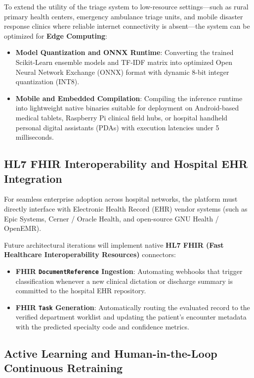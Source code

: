 To extend the utility of the triage system to low-resource settings---such as rural primary health centers, emergency ambulance triage units, and mobile disaster response clinics where reliable internet connectivity is absent---the system can be optimized for \textbf{Edge Computing}:
\begin{itemize}
    \item \textbf{Model Quantization and ONNX Runtime}: Converting the trained Scikit-Learn ensemble models and TF-IDF matrix into optimized Open Neural Network Exchange (ONNX) format with dynamic 8-bit integer quantization (INT8).
    \item \textbf{Mobile and Embedded Compilation}: Compiling the inference runtime into lightweight native binaries suitable for deployment on Android-based medical tablets, Raspberry Pi clinical field hubs, or hospital handheld personal digital assistants (PDAs) with execution latencies under 5 milliseconds.
\end{itemize}

\subsection{HL7 FHIR Interoperability and Hospital EHR Integration}

For seamless enterprise adoption across hospital networks, the platform must directly interface with Electronic Health Record (EHR) vendor systems (such as Epic Systems, Cerner / Oracle Health, and open-source GNU Health / OpenEMR).

Future architectural iterations will implement native \textbf{HL7 FHIR (Fast Healthcare Interoperability Resources)} connectors:
\begin{itemize}
    \item \textbf{FHIR \texttt{DocumentReference} Ingestion}: Automating webhooks that trigger classification whenever a new clinical dictation or discharge summary is committed to the hospital EHR repository.
    \item \textbf{FHIR \texttt{Task} Generation}: Automatically routing the evaluated record to the verified department worklist and updating the patient's encounter metadata with the predicted specialty code and confidence metrics.
\end{itemize}

\subsection{Active Learning and Human-in-the-Loop Continuous Retraining}

